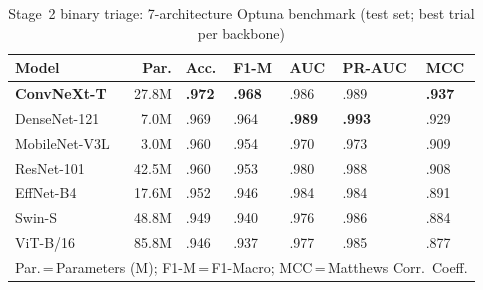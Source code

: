 \documentclass[conference]{IEEEtran}
\begin{document}
\begin{table}[t]
  \caption{Stage~2 binary triage: 7-architecture Optuna benchmark (test set; best trial per backbone)}
  \label{tab:stage2_results}
  \begin{center}
  \renewcommand{\arraystretch}{1.05}\small
  \setlength{\tabcolsep}{3.0pt}
  \begin{tabular}{p{1.75cm}rp{0.6cm}p{0.65cm}p{0.65cm}p{0.72cm}p{0.65cm}}
    \toprule
    \textbf{Model} & \textbf{Par.} & \textbf{Acc.} & \textbf{F1-M} & \textbf{AUC} & \textbf{PR-AUC} & \textbf{MCC}\\
    \midrule
    \textbf{ConvNeXt-T} & 27.8M & \textbf{.972} & \textbf{.968} & .986 & .989 & \textbf{.937}\\
    DenseNet-121        &  7.0M & .969           & .964          & \textbf{.989} & \textbf{.993} & .929\\
    MobileNet-V3L       &  3.0M & .960           & .954          & .970 & .973 & .909\\
    ResNet-101          & 42.5M & .960           & .953          & .980 & .988 & .908\\
    EffNet-B4           & 17.6M & .952           & .946          & .984 & .984 & .891\\
    Swin-S              & 48.8M & .949           & .940          & .976 & .986 & .884\\
    ViT-B/16            & 85.8M & .946           & .937          & .977 & .985 & .877\\
    \bottomrule
    \multicolumn{7}{l}{\footnotesize Par.\,=\,Parameters (M); F1-M\,=\,F1-Macro; MCC\,=\,Matthews Corr.\ Coeff.}
  \end{tabular}
  \end{center}
\end{table}
\end{document}
